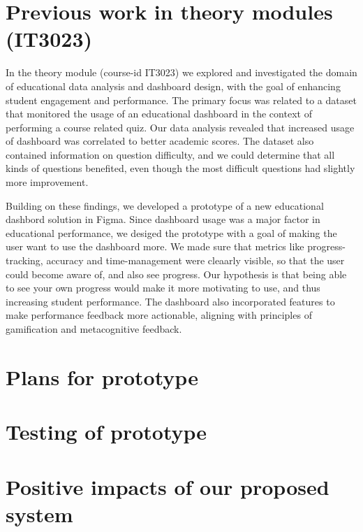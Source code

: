 \section{Previous work in theory modules (IT3023)}
In the theory module (course-id IT3023) we explored and investigated the domain of educational data analysis and dashboard design, with the goal of enhancing student engagement and performance. The primary focus was related to a dataset that monitored the usage of an educational dashboard in the context of performing a course related quiz. Our data analysis revealed that increased usage of dashboard was correlated to better academic scores. The dataset also contained information on question difficulty, and we could determine that all kinds of questions benefited, even though the most difficult questions had slightly more improvement.

Building on these findings, we developed a prototype of a new educational dashbord solution in Figma. Since dashboard usage was a major factor in educational performance, we desiged the prototype with a goal of making the user want to use the dashboard more. We made sure that metrics like progress-tracking, accuracy and time-management were cleaarly visible, so that the user could become aware of, and also see progress. Our hypothesis is that being able to see your own progress would make it more motivating to use, and thus increasing student performance. The dashboard also incorporated features to make performance feedback more actionable, aligning with principles of gamification and metacognitive feedback.

\section{Plans for prototype}
\section{Testing of prototype}





\section{Positive impacts of our proposed system}

